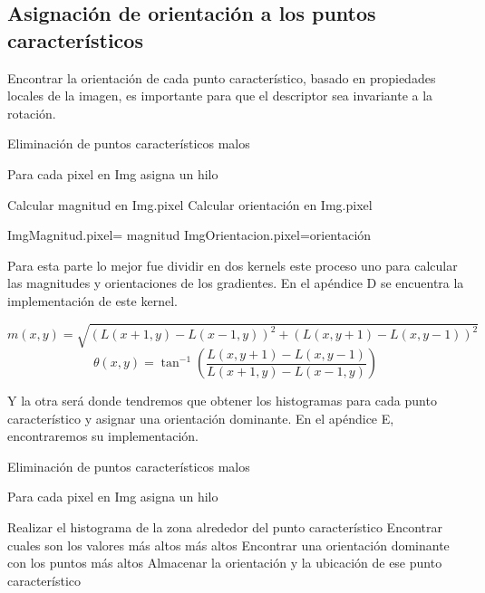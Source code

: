 \subsection{Asignación de orientación a los puntos característicos}

Encontrar la orientación de cada punto característico, basado en propiedades locales de la imagen, es importante para que el descriptor sea invariante a la rotación.


\begin{algorithm}[H]
\caption{Eliminación de puntos característicos malos}
 Para cada pixel en Img asigna un hilo\;
 
 {
	Calcular magnitud en Img.pixel\;
	Calcular orientación en Img.pixel\;
	
	ImgMagnitud.pixel= magnitud\;
	ImgOrientacion.pixel=orientación\;
	
}
\end{algorithm}



Para esta parte lo mejor fue dividir en dos kernels este proceso uno para calcular las magnitudes y orientaciones de los gradientes. En el apéndice D se encuentra la implementación de este kernel.

$$m(x,y) = \sqrt{ (L(x+1,y)-L(x-1,y))^2 + (L(x,y+1)-L(x,y-1))^2 }$$		
$$\theta(x,y) =  \tan^{-1} \left(\frac{L(x,y+1)-L(x,y-1)}{L(x+1,y)-L(x-1,y)}\right)$$


Y la otra será donde tendremos que obtener los histogramas para cada punto característico y asignar una orientación dominante. En el apéndice E, encontraremos su implementación. 

\pagebreak

\begin{algorithm}[H]
\caption{Eliminación de puntos característicos malos}
 Para cada pixel en Img asigna un hilo\;
 
 {
	{
		Realizar el histograma de la zona alrededor del punto característico\;
		Encontrar cuales son los valores más altos más altos\;
		Encontrar una orientación dominante con los puntos más altos\;
		Almacenar la orientación y la ubicación de ese punto característico\; 
				
	}
}
	
\end{algorithm}




